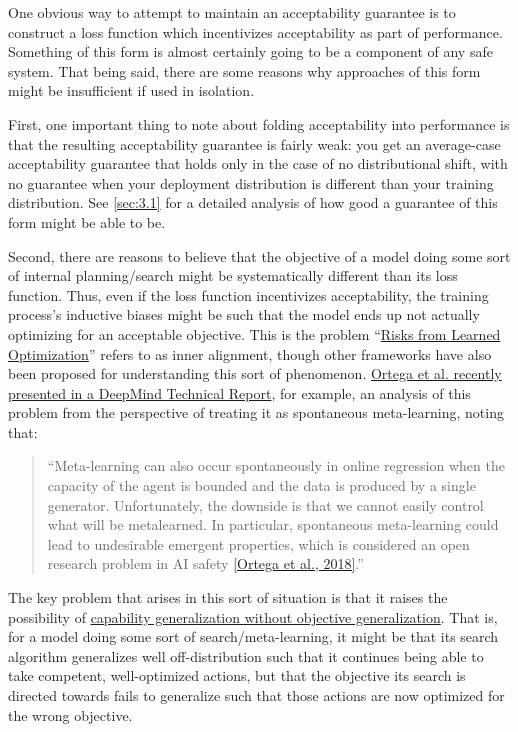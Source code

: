 \documentclass{amsart}
\begin{document}
One obvious way to attempt to maintain an acceptability guarantee is to construct a loss function which incentivizes acceptability as part of performance. Something of this form is almost certainly going to be a component of any safe system. That being said, there are some reasons why approaches of this form might be insufficient if used in isolation.

First, one important thing to note about folding acceptability into performance is that the resulting acceptability guarantee is fairly weak: you get an average-case acceptability guarantee that holds only in the case of no distributional shift, with no guarantee when your deployment distribution is different than your training distribution. See \autoref{sec:3.1} for a detailed analysis of how good a guarantee of this form might be able to be.

Second, there are reasons to believe that the objective of a model doing some sort of internal planning/search might be systematically different than its loss function. Thus, even if the loss function incentivizes acceptability, the training process's inductive biases might be such that the model ends up not actually optimizing for an acceptable objective. This is the problem ``\href{https://arxiv.org/abs/1906.01820}{Risks from Learned Optimization}'' refers to as inner alignment, though other frameworks have also been proposed for understanding this sort of phenomenon. \href{https://arxiv.org/abs/1905.03030}{Ortega et al. recently presented in a DeepMind Technical Report}, for example, an analysis of this problem from the perspective of treating it as spontaneous meta-learning, noting that:
\begin{quote}
    ``Meta-learning can also occur spontaneously in online regression when the capacity of the agent is bounded and the data is produced by a single generator. Unfortunately, the downside is that we cannot easily control what will be metalearned. In particular, spontaneous meta-learning could lead to undesirable emergent properties, which is considered an open research problem in AI safety \href{https://medium.com/@deepmindsafetyresearch/building-safe-artificial-intelligence-52f5f75058f1}{[Ortega et al., 2018]}.''
\end{quote}
The key problem that arises in this sort of situation is that it raises the possibility of \href{https://www.alignmentforum.org/posts/2mhFMgtAjFJesaSYR/2-d-robustness}{capability generalization without objective generalization}. That is, for a model doing some sort of search/meta-learning, it might be that its search algorithm generalizes well off-distribution such that it continues being able to take competent, well-optimized actions, but that the objective its search is directed towards fails to generalize such that those actions are now optimized for the wrong objective.
\end{document}
